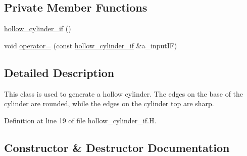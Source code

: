 \subsection*{Private Member Functions}
\begin{DoxyCompactItemize}
\item 
\hyperlink{classhollow__cylinder__if_a4d447fd9170d2d004fe375e6d66fa397}{hollow\+\_\+cylinder\+\_\+if} ()
\item 
void \hyperlink{classhollow__cylinder__if_a1aa26da374c561a5d8233d54b1a31468}{operator=} (const \hyperlink{classhollow__cylinder__if}{hollow\+\_\+cylinder\+\_\+if} \&a\+\_\+input\+IF)
\end{DoxyCompactItemize}


\subsection{Detailed Description}
This class is used to generate a hollow cylinder. The edges on the base of the cylinder are rounded, while the edges on the cylinder top are sharp. 

Definition at line 19 of file hollow\+\_\+cylinder\+\_\+if.\+H.



\subsection{Constructor \& Destructor Documentation}
